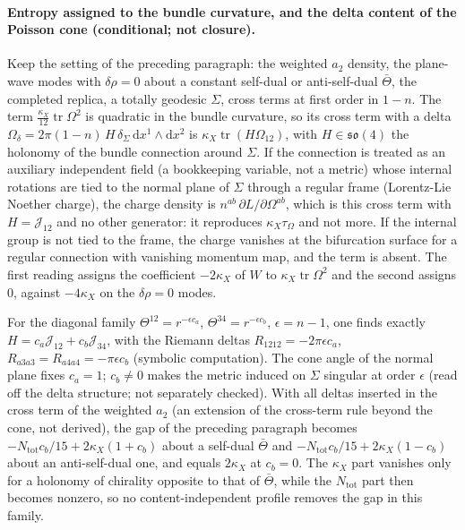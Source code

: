 \paragraph{Entropy assigned to the bundle curvature, and the delta content of the Poisson cone (conditional; not closure).}
Keep the setting of the preceding paragraph: the weighted \(a_2\) density, the plane-wave modes with \(\delta\rho=0\) about a constant self-dual or anti-self-dual \(\bar\Theta\), the completed replica, a totally geodesic \(\Sigma\), cross terms at first order in \(1-n\). The term \(\tfrac{\kappa_X}{12}\operatorname{tr}\Omega^2\) is quadratic in the bundle curvature, so its cross term with a delta \(\Omega_\delta=2\pi(1-n)\,H\,\delta_\Sigma\,\mathrm dx^1\wedge\mathrm dx^2\) is \(\kappa_X\operatorname{tr}(H\Omega_{12})\), with \(H\in\mathfrak{so}(4)\) the holonomy of the bundle connection around \(\Sigma\). If the connection is treated as an auxiliary independent field (a bookkeeping variable, not a metric) whose internal rotations are tied to the normal plane of \(\Sigma\) through a regular frame (Lorentz-Lie Noether charge), the charge density is \(n^{ab}\,\partial L/\partial\Omega^{ab}\), which is this cross term with \(H=\mathcal J_{12}\) and no other generator: it reproduces \(\kappa_X\tau_\Omega\) and not more. If the internal group is not tied to the frame, the charge vanishes at the bifurcation surface for a regular connection with vanishing momentum map, and the term is absent. The first reading assigns the coefficient \(-2\kappa_X\) of \(W\) to \(\kappa_X\operatorname{tr}\Omega^2\) and the second assigns \(0\), against \(-4\kappa_X\) on the \(\delta\rho=0\) modes.

For the diagonal family \(\Theta^{12}=r^{-\epsilon c_a}\), \(\Theta^{34}=r^{-\epsilon c_b}\), \(\epsilon=n-1\), one finds exactly \(H=c_a\mathcal J_{12}+c_b\mathcal J_{34}\), with the Riemann deltas \(R_{1212}=-2\pi\epsilon c_a\), \(R_{a3a3}=R_{a4a4}=-\pi\epsilon c_b\) (symbolic computation). The cone angle of the normal plane fixes \(c_a=1\); \(c_b\neq0\) makes the metric induced on \(\Sigma\) singular at order \(\epsilon\) (read off the delta structure; not separately checked). With all deltas inserted in the cross term of the weighted \(a_2\) (an extension of the cross-term rule beyond the cone, not derived), the gap of the preceding paragraph becomes \(-N_{\mathrm{tot}}c_b/15+2\kappa_X(1+c_b)\) about a self-dual \(\bar\Theta\) and \(-N_{\mathrm{tot}}c_b/15+2\kappa_X(1-c_b)\) about an anti-self-dual one, and equals \(2\kappa_X\) at \(c_b=0\). The \(\kappa_X\) part vanishes only for a holonomy of chirality opposite to that of \(\bar\Theta\), while the \(N_{\mathrm{tot}}\) part then becomes nonzero, so no content-independent profile removes the gap in this family.

